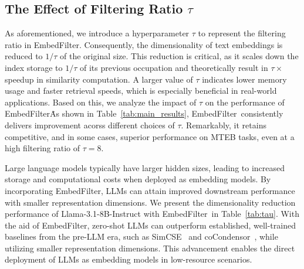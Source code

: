 \documentclass[sigconf]{acmart}
\newcommand{\name}{EmbedFilter}
\begin{document}
\subsection{The Effect of Filtering Ratio \(\tau\)}
As aforementioned, we introduce a hyperparameter \(\tau\) to represent the filtering ratio in \name.
Consequently, the dimensionality of text embeddings is reduced to \(1/\tau\) of the original size.
This reduction is critical, as it scales down the index storage to \(1/\tau\) of its previous occupation and theoretically result in \(\tau \times\) speedup in similarity computation.
A larger value of \(\tau\) indicates lower memory usage and faster retrieval speeds, which is especially beneficial in real-world applications.
Based on this, we analyze the impact of \(\tau\) on the performance of \name\.
As shown in Table~\ref{tab:main_results}, \name\ consistently delivers improvement acorss different choices of \(\tau\).
Remarkably, it retains competitive, and in some cases, superior performance on MTEB tasks, even at a high filtering ratio of \(\tau=8\).

Large language models typically have larger hidden sizes, leading to increased storage and computational costs when deployed as embedding models.
By incorporating \name, LLMs can attain improved downstream performance with smaller representation dimensions.
We present the dimensionality reduction performance of Llama-3.1-8B-Instruct with \name~in Table~\ref{tab:tau}.
With the aid of \name, zero-shot LLMs can outperform established, well-trained baselines from the pre-LLM era, such as SimCSE~\cite{simcse} and coCondensor~\cite{cocondensor}, while utilizing smaller representation dimensions.
This advancement enables the direct deployment of LLMs as embedding models in low-resource scenarios.
\end{document}
